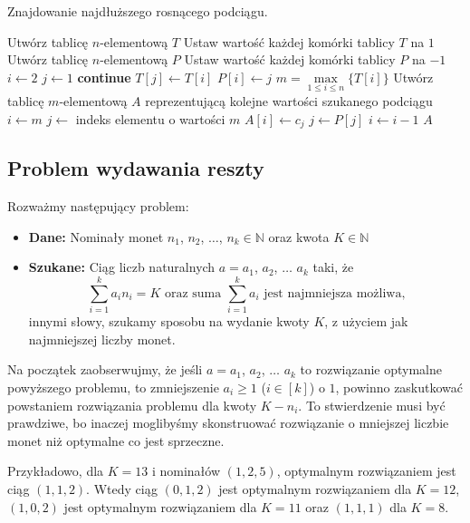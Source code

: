 \begin{algorithm}[H]
	\caption{Znajdowanie najdłuższego rosnącego podciągu.}\label{MaxIncreasingSubseqence}
	\begin{algorithmic}[1]
		\State Utwórz tablicę $n$-elementową $T$
		\State Ustaw wartość każdej komórki tablicy $T$ na $1$
		\State Utwórz tablicę $n$-elementową $P$
		\State Ustaw wartość każdej komórki tablicy $P$ na $-1$
		\State $i \gets 2$
		\State $j \gets 1$
		\textbf{continue}
		\EndIf
		\State $T[j] \gets T[i]$
		\State $P[i] \gets j$
		\EndIf
		\EndWhile
		\EndWhile
		\State $m = \max\limits_{1 \leq i \leq n}\{T[i]\}$ 
		\State Utwórz tablicę $m$-elementową $A$ reprezentującą
		kolejne wartości szukanego podciągu
		\State $i \gets m$
		\State $j \gets$ indeks elementu o wartości $m$
		\State $A[i] \gets c_j$
		\State $j \gets P[j]$
		\State $i \gets i - 1$
		\EndWhile
		\State \Return $A$
		\EndProcedure
	\end{algorithmic}
\end{algorithm}

\subsection{Problem wydawania reszty}
Rozważmy następujący problem:
\begin{itemize}
	\item[] \textbf{Dane:} Nominały monet $n_1$, $n_2$, 
	$\ldots$, $n_k \in \mathbb{N}$ oraz kwota $K \in \mathbb{N}$
	\item[] \textbf{Szukane:} Ciąg liczb naturalnych $a = a_1$, $a_2$,
	$\ldots$ $a_k$ taki, że 
	\[\sum\limits_{i=1}^{k} a_in_i = K \text{ oraz suma } 
	\sum\limits_{i=1}^{k} a_i
	\text{ jest najmniejsza możliwa,}\]
	innymi słowy, szukamy sposobu na wydanie kwoty $K$, z użyciem
	jak najmniejszej liczby monet.
\end{itemize}

Na początek zaobserwujmy, że jeśli $a = a_1$, $a_2$,
$\ldots$ $a_k$ to rozwiązanie optymalne powyższego problemu, to 
zmniejszenie $a_i \geq 1$ ($i \in [k]$) o $1$, powinno 
zaskutkować powstaniem rozwiązania problemu dla kwoty $K - n_i$.
To stwierdzenie musi być prawdziwe, bo inaczej moglibyśmy
skonstruować rozwiązanie o mniejszej liczbie monet
niż optymalne co jest sprzeczne.

Przykładowo, dla $K = 13$ i nominałów $(1, 2, 5)$, optymalnym
rozwiązaniem jest ciąg $(1, 1, 2)$. Wtedy ciąg $(0, 1, 2)$
jest optymalnym rozwiązaniem dla $K = 12$, 
$(1, 0, 2)$ jest optymalnym rozwiązaniem dla $K = 11$ oraz
$(1, 1, 1)$ dla $K = 8$.

